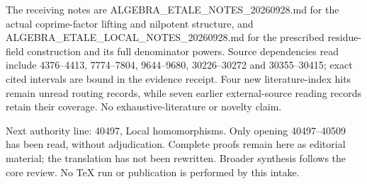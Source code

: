 The receiving notes are ALGEBRA\_\allowbreak{}ETALE\_\allowbreak{}NOTES\_\allowbreak{}20260928.\allowbreak{}md for the actual coprime-factor lifting and nilpotent structure, and ALGEBRA\_\allowbreak{}ETALE\_\allowbreak{}LOCAL\_\allowbreak{}NOTES\_\allowbreak{}20260928.\allowbreak{}md for the prescribed residue-field construction and its full denominator powers. Source dependencies read include 4376--4413, 7774--7804, 9644--9680, 30226--30272 and 30355--30415; exact cited intervals are bound in the evidence receipt. Four new literature-index hits remain unread routing records, while seven earlier external-source reading records retain their coverage. No exhaustive-literature or novelty claim.

Next authority line: 40497, Local homomorphisms. Only opening 40497--40509 has been read, without adjudication. Complete proofs remain here as editorial material; the translation has not been rewritten. Broader synthesis follows the core review. No TeX run or publication is performed by this intake.
